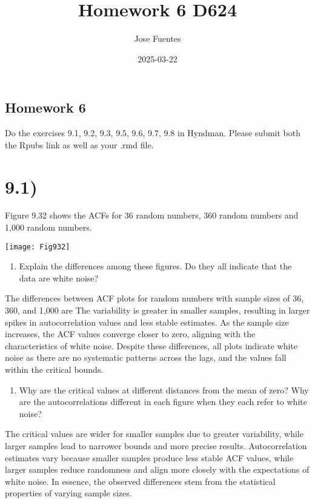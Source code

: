 \documentclass[
]{article}
\title{Homework 6 D624}
\author{Jose Fuentes}
\date{2025-03-22}
\providecommand{\tightlist}{%
  \setlength{\itemsep}{0pt}\setlength{\parskip}{0pt}}
\begin{document}
\maketitle

\subsection{Homework 6}\label{homework-6}

Do the exercises 9.1, 9.2, 9.3, 9.5, 9.6, 9.7, 9.8 in Hyndman. Please
submit both the Rpubs link as well as your .rmd file.

\section{9.1)}\label{section}

Figure 9.32 shows the ACFs for 36 random numbers, 360 random numbers and
1,000 random numbers.

\texttt{[image: Fig932]}

\begin{enumerate}
\def\labelenumi{\alph{enumi})}
\tightlist
\item
  Explain the differences among these figures. Do they all indicate that
  the data are white noise?
\end{enumerate}

The differences between ACF plots for random numbers with sample sizes
of 36, 360, and 1,000 are The variability is greater in smaller samples,
resulting in larger spikes in autocorrelation values and less stable
estimates. As the sample size increases, the ACF values converge closer
to zero, aligning with the characteristics of white noise. Despite these
differences, all plots indicate white noise as there are no systematic
patterns across the lags, and the values fall within the critical
bounds.

\begin{enumerate}
\def\labelenumi{\alph{enumi})}
\setcounter{enumi}{1}
\tightlist
\item
  Why are the critical values at different distances from the mean of
  zero? Why are the autocorrelations different in each figure when they
  each refer to white noise?
\end{enumerate}

The critical values are wider for smaller samples due to greater
variability, while larger samples lead to narrower bounds and more
precise results. Autocorrelation estimates vary because smaller samples
produce less stable ACF values, while larger samples reduce randomness
and align more closely with the expectations of white noise. In essence,
the observed differences stem from the statistical properties of varying
sample sizes.
\end{document}

